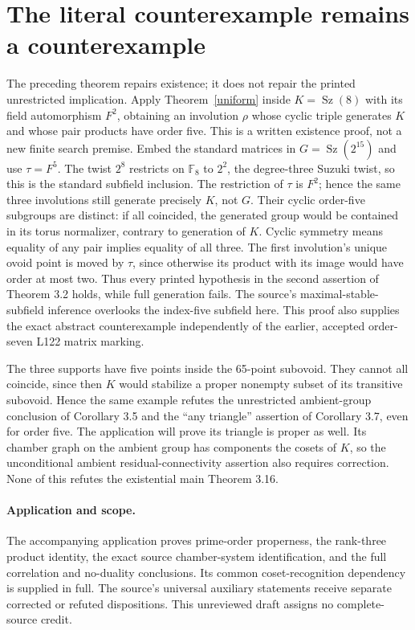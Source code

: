 \documentclass[11pt,a4paper]{article}
\newcommand{\Sz}{\operatorname{Sz}}\newcommand{\Aut}{\operatorname{Aut}}\newcommand{\gen}[1]{\langle#1\rangle}
\begin{document}
\section{The literal counterexample remains a counterexample}
The preceding theorem repairs existence; it does not repair the printed
unrestricted implication. Apply Theorem~\ref{uniform} inside $K=\Sz(8)$
with its field automorphism $F^2$, obtaining an involution $\rho$ whose
cyclic triple generates $K$ and whose pair products have order five.
This is a written existence proof, not a new finite search premise.
Embed the standard matrices in $G=\Sz(2^{15})$ and use $\tau=F^5$.
The twist $2^8$ restricts on $\mathbb F_8$ to $2^2$, the degree-three
Suzuki twist, so this is the standard subfield inclusion. The restriction
of $\tau$ is $F^2$; hence the same three involutions still generate
precisely $K$, not $G$. Their cyclic order-five subgroups are distinct:
if all coincided, the generated group would be contained in its torus
normalizer, contrary to generation of $K$. Cyclic symmetry means equality
of any pair implies equality of all three. The first involution's unique
ovoid point is moved by $\tau$, since otherwise its product with its
image would have order at most two. Thus every printed hypothesis in the
second assertion of Theorem 3.2 holds, while full generation fails.
The source's maximal-stable-subfield inference overlooks the index-five
subfield here. This proof also supplies the exact abstract counterexample
independently of the earlier, accepted order-seven L122 matrix marking.

The three supports have five points inside the 65-point subovoid. They
cannot all coincide, since then $K$ would stabilize a proper nonempty
subset of its transitive subovoid. Hence the same example refutes the
unrestricted ambient-group conclusion of Corollary 3.5 and the ``any
triangle'' assertion of Corollary 3.7, even for order five. The application
will prove its triangle is proper as well. Its chamber graph on the
ambient group has components the cosets of $K$, so the unconditional
ambient residual-connectivity assertion also requires correction.
None of this refutes the existential main Theorem 3.16.

\paragraph{Application and scope.}
The accompanying application proves prime-order properness, the rank-three product identity,
the exact source chamber-system identification, and the full correlation
and no-duality conclusions. Its common coset-recognition dependency is
supplied in full. The source's universal auxiliary statements receive
separate corrected or refuted dispositions. This unreviewed draft assigns
no complete-source credit.
\end{document}
